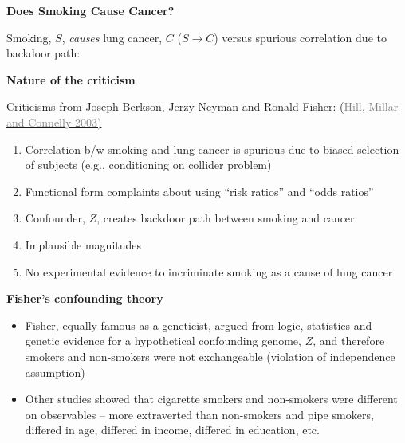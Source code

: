 \documentclass[notes=show]{beamer}
\newcommand{\myurlshort}[2]{\href{#1}{\textcolor{gray}{\textsf{#2}}}}
\begin{document}
	
\begin{frame}[plain]
	\begin{center}	
	\textbf{Does Smoking Cause Cancer?}
	\end{center}
	
	 Smoking, $S$, \emph{causes} lung cancer, $C$ ($S \rightarrow C$) versus spurious correlation due to backdoor path:
	
		\begin{center}
		\end{center}
	
\end{frame}


\begin{frame}[plain]
\begin{center}
\textbf{Nature of the criticism}
\end{center}

Criticisms from Joseph Berkson, Jerzy Neyman and Ronald Fisher: (\myurlshort{https://www.utpjournals.press/doi/abs/10.3138/cbmh.20.2.367}{Hill, Millar and Connelly 2003)}
		\begin{enumerate}
		\item Correlation b/w smoking and lung cancer is spurious due to biased selection of subjects (e.g., conditioning on collider problem)
		\item Functional form complaints about using ``risk ratios'' and ``odds ratios''
		\item Confounder, $Z$, creates backdoor path between smoking and cancer
		\item Implausible magnitudes
		\item No experimental evidence to incriminate smoking as a cause of lung cancer
		\end{enumerate}
\end{frame}

\begin{frame}[plain]
\begin{center}
\textbf{Fisher's confounding theory}
\end{center}
		\begin{itemize}
		\item Fisher, equally famous as a geneticist, argued from logic, statistics and genetic evidence for a hypothetical confounding genome, $Z$, and therefore smokers and non-smokers were not exchangeable (violation of independence assumption)
		\item Other studies showed that cigarette smokers and non-smokers were different on observables -- more extraverted than non-smokers and pipe smokers, differed in age, differed in income, differed in education, etc.
		\end{itemize}
\end{frame}
\end{document}
